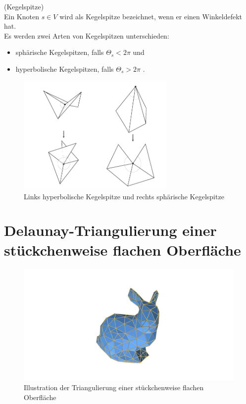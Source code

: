 \begin{definition}(Kegelspitze)\\

Ein Knoten $s \in V$  wird als Kegelspitze bezeichnet, wenn er einen Winkeldefekt hat.\\
 
Es werden zwei Arten von Kegelspitzen unterschieden:
 \begin{itemize}
     \item sphärische Kegelspitzen, falls $\Theta_s < 2\pi $ und 
     \item hyperbolische Kegelspitzen, falls $\Theta_s > 2\pi $ .
 \end{itemize} 


\begin{figure}[h]%
    \centering
  \includegraphics[width=3in]{images/Merged_document.png}
  \caption{Links hyperbolische Kegelspitze und rechts sphärische Kegelspitze   \cite{Polthier:2006:SIGGRAPH}}
\end{figure}
 

\end{definition}

\section*{Delaunay-Triangulierung einer stückchenweise flachen Oberfläche}
\begin{figure}[H]%
    \label{fig:hase}
    \centering
    \includegraphics[width=5in]{images/image1.png}
  \caption{Illustration der Triangulierung einer stückchenweise flachen Oberfläche}
\end{figure}

